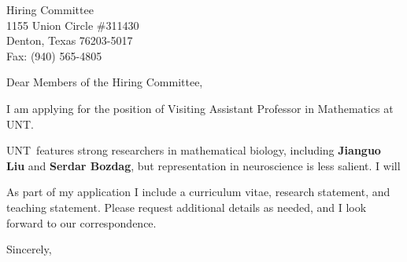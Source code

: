 \documentclass[11pt,a4paper]{letter}
\begin{document}
\def\School{UNT}
\begin{letter}
{Hiring Committee\\
1155 Union Circle \#311430\\
Denton, Texas 76203-5017\\
Fax: (940) 565-4805}


\opening{Dear Members of the Hiring Committee,}

I am applying for the position of Visiting Assistant Professor in Mathematics at \School. 



\School~features strong researchers in mathematical biology, including \textbf{Jianguo Liu} and \textbf{Serdar Bozdag}, but representation in neuroscience is less salient. I will 



As part of my application I include a curriculum vitae, research statement, and teaching statement. Please request additional details as needed, and I look forward to our correspondence.

\closing{Sincerely,}
\end{letter}
\end{document}
